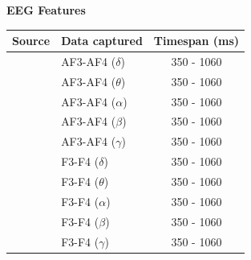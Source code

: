 \begin{table}
    \centering

    {\large \textbf{EEG Features}}\vspace{2pt}
    \begin{tabularx}{\columnwidth}{cXc}
        \toprule
        \textbf{Source} & \textbf{Data captured} & \textbf{Timespan (ms)} \\
        \midrule
        \small{\cite{eeg_music_listening,eeg_timespan_1,eeg_electrodes_1,eeg_electrodes_0}} & AF3-AF4 ($\delta$) & 350 - 1060 \\
        \small{\cite{eeg_music_listening,eeg_timespan_1,eeg_electrodes_1,eeg_electrodes_0}} & AF3-AF4 ($\theta$) & 350 - 1060 \\
        \small{\cite{eeg_music_listening,eeg_timespan_1,eeg_electrodes_1,eeg_electrodes_0}} & AF3-AF4 ($\alpha$) & 350 - 1060 \\
        \small{\cite{eeg_music_listening,eeg_timespan_1,eeg_electrodes_1,eeg_electrodes_0}} & AF3-AF4 ($\beta$)  & 350 - 1060 \\
        \small{\cite{eeg_music_listening,eeg_timespan_1,eeg_electrodes_1,eeg_electrodes_0}} & AF3-AF4 ($\gamma$) & 350 - 1060 \\
        \small{\cite{eeg_music_listening,eeg_timespan_1,eeg_electrodes_1,eeg_electrodes_0}} & F3-F4 ($\delta$) & 350 - 1060 \\
        \small{\cite{eeg_music_listening,eeg_timespan_1,eeg_electrodes_1,eeg_electrodes_0}} & F3-F4 ($\theta$) & 350 - 1060 \\
        \small{\cite{eeg_music_listening,eeg_timespan_1,eeg_electrodes_1,eeg_electrodes_0}} & F3-F4 ($\alpha$) & 350 - 1060 \\
        \small{\cite{eeg_music_listening,eeg_timespan_1,eeg_electrodes_1,eeg_electrodes_0}} & F3-F4 ($\beta$)  & 350 - 1060 \\
        \small{\cite{eeg_music_listening,eeg_timespan_1,eeg_electrodes_1,eeg_electrodes_0}} & F3-F4 ($\gamma$) & 350 - 1060 \\
        \bottomrule
    \end{tabularx}
    \label{[TABLE] features eeg}


\end{table}
